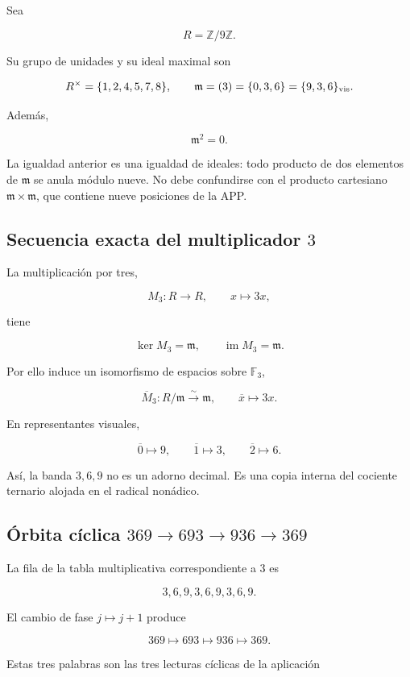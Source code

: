 Sea

\[
R=\mathbb Z/9\mathbb Z.
\]

Su grupo de unidades y su ideal maximal son

\[
R^\times=\{1,2,4,5,7,8\},
\qquad
\mathfrak m=(3)=\{0,3,6\}=\{9,3,6\}_{\rm vis}.
\]

Además,

\[
\mathfrak m^2=0.
\]

La igualdad anterior es una igualdad de ideales: todo producto de dos elementos de \(\mathfrak m\) se anula módulo nueve. No debe confundirse con el producto cartesiano \(\mathfrak m\times\mathfrak m\), que contiene nueve posiciones de la APP.

\subsection{Secuencia exacta del multiplicador \(3\)}

La multiplicación por tres,

\[
M_3:R\longrightarrow R,
\qquad x\longmapsto3x,
\]

tiene

\[
\ker M_3=\mathfrak m,
\qquad
\operatorname{im}M_3=\mathfrak m.
\]

Por ello induce un isomorfismo de espacios sobre \(\mathbb F_3\),

\[
\overline M_3:R/\mathfrak m\xrightarrow{\sim}\mathfrak m,
\qquad
\overline x\longmapsto3x.
\]

En representantes visuales,

\[
\overline0\longmapsto9,
\qquad
\overline1\longmapsto3,
\qquad
\overline2\longmapsto6.
\]

Así, la banda \(3,6,9\) no es un adorno decimal. Es una copia interna del cociente ternario alojada en el radical nonádico.

\subsection{Órbita cíclica \(369\to693\to936\to369\)}

La fila de la tabla multiplicativa correspondiente a \(3\) es

\[
3,6,9,3,6,9,3,6,9.
\]

El cambio de fase \(j\mapsto j+1\) produce

\[
369\longmapsto693\longmapsto936\longmapsto369.
\]

Estas tres palabras son las tres lecturas cíclicas de la aplicación


